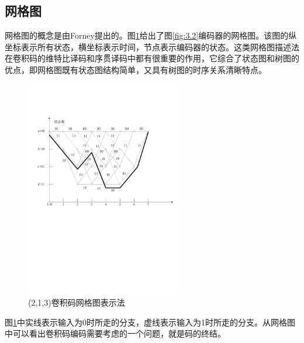 \subsection{网格图}
网格图的概念是由Forney提出的。图\ref{fig:3.4}给出了图\ref{fig:3.2}编码器的网格图。该图的纵坐标表示所有状态，横坐标表示时间，节点表示编码器的状态。这类网格图描述法在卷积码的维特比译码和序贯译码中都有很重要的作用，它综合了状态图和树图的优点，即网格图既有状态图结构简单，又具有树图的时序关系清晰特点。
\begin{figure}[htb]
  \begin{center}
    \includegraphics[width=0.6\textwidth]{images/conv4.pdf}
  \end{center}
  \caption{(2,1,3)卷积码网格图表示法}
  \label{fig:3.4}
\end{figure}
图\ref{fig:3.4}中实线表示输入为0时所走的分支，虚线表示输入为1时所走的分支。从网格图中可以看出卷积码编码需要考虑的一个问题，就是码的终结。

